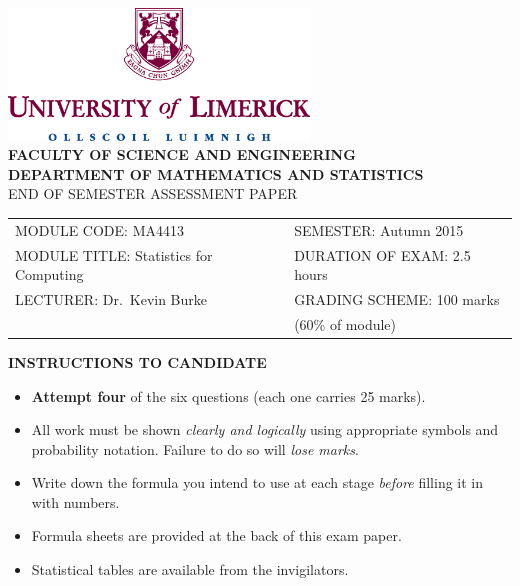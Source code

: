 \documentclass[12pt]{article}
\begin{document}
\begin{center}
\includegraphics[width=0.6\textwidth]{ul_logo}
\quad\\[1cm]
{\bf\large FACULTY OF SCIENCE AND ENGINEERING\\[0.5cm]}
{\bf\small DEPARTMENT OF MATHEMATICS AND STATISTICS\\[0.8cm]}
{\large END OF SEMESTER ASSESSMENT PAPER\\[2cm]}
\begin{adjustwidth}{-1cm}{0cm}
\begin{tabular}{l@{\qquad}l}
MODULE CODE: MA4413&SEMESTER: Autumn 2015\\[1cm]
MODULE TITLE: Statistics for Computing& DURATION OF EXAM: 2.5 hours\\[1cm]
LECTURER: Dr.~Kevin Burke& GRADING SCHEME: 100 marks \\
& \hspace{3cm} (60\% of module)\\[2cm]
\end{tabular}
\end{adjustwidth}
{\bf INSTRUCTIONS TO CANDIDATE}
\end{center}
\begin{small}
\begin{itemize}\itemsep0.3cm
\item {\bf Attempt four} of the six questions (each one carries 25 marks).
\item All work must be shown \emph{clearly and logically} using appropriate symbols and probability notation. Failure to do so will \emph{lose marks}.
\item Write down the formula you intend to use at each stage \emph{before} filling it in with numbers.
\item Formula sheets are provided at the back of this exam paper.
\item Statistical tables are available from the invigilators.
\end{itemize}
\end{small}
\newpage
\end{document}
